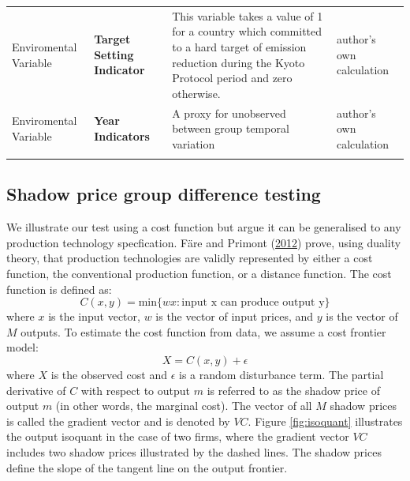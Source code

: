 \documentclass[
  12pt,
]{article}
\begin{document}
\begin{ThreePartTable}
\begin{longtable}[t]{>{\raggedright\arraybackslash}p{10em}>{\raggedright\arraybackslash}p{10em}>{\raggedright\arraybackslash}p{10em}>{\raggedright\arraybackslash}p{10em}}
Enviromental Variable & \textbf{Target Setting Indicator} & This variable takes a value of 1 for a country which committed to a hard target of emission reduction during the Kyoto Protocol period and zero otherwise. & author's own calculation\\
Enviromental Variable & \textbf{Year Indicators} & A proxy for unobserved between group temporal variation & author's own calculation\\*
\end{longtable}
\end{ThreePartTable}
\endgroup{}

\hypertarget{shadow-price-group-difference-testing}{%
\subsection{Shadow price group difference testing}\label{shadow-price-group-difference-testing}}

We illustrate our test using a cost function but argue it can be generalised to any production technology specfication. Färe and Primont (\protect\hyperlink{ref-Fare2012}{2012}) prove, using duality theory, that production technologies are validly represented by either a cost function, the conventional production function, or a distance function. The cost function is defined as:
\begin{equation}
C(x,y)=\text{min} \{wx:\text{input x can produce output y}\}
\label{eq:CostFn}
\end{equation}
where \(x\) is the input vector, \(w\) is the vector of input prices, and \(y\) is the vector of \(M\) outputs. To estimate the cost function from data, we assume a cost frontier model:
\begin{equation}
X=C(x,y) + \epsilon
\label{eq:CostFront}
\end{equation}
where \(X\) is the observed cost and \(\epsilon\) is a random disturbance term. The partial derivative of \(C\) with respect to output \(m\) is referred to as the shadow price of output \(m\) (in other words, the marginal cost). The vector of all \(M\) shadow prices is called the gradient vector and is denoted by \(VC\). Figure \ref{fig:isoquant} illustrates the output isoquant in the case of two firms, where the gradient vector \(VC\) includes two shadow prices illustrated by the dashed lines. The shadow prices define the slope of the tangent line on the output frontier.
\end{document}
